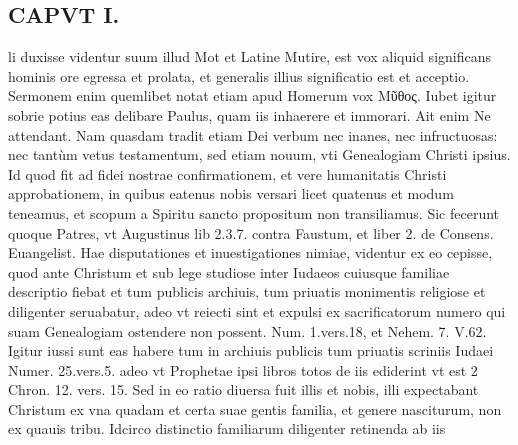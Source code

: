 \documentclass{article}
\begin{document}
\begin{pages}
\section*{CAPVT I. }
\marginpar{[ p.11 ]}\pstart li duxisse videntur suum illud Mot et Latine Mutire, est vox aliquid significans hominis ore egressa et prolata, et generalis illius significatio est et acceptio. Sermonem enim quemlibet notat etiam apud Homerum vox Μῦθος. Iubet igitur sobrie potius eas delibare Paulus, quam iis inhaerere et immorari. Ait enim Ne attendant. Nam quasdam tradit etiam Dei verbum nec inanes, nec infructuosas: nec tantùm vetus testamentum, sed etiam nouum, vti Genealogiam Christi ipsius. Id quod fit ad fidei nostrae confirmationem, et vere humanitatis Christi approbationem, in quibus eatenus nobis versari licet quatenus et modum teneamus, et scopum a Spiritu sancto propositum non transiliamus. Sic fecerunt quoque Patres, vt Augustinus lib 2.3.7. contra Faustum, et liber 2. de Consens. Euangelist.  \pend\pstart Hae disputationes et inuestigationes nimiae, videntur ex eo cepisse, quod ante Christum et sub lege studiose inter Iudaeos cuiusque familiae descriptio fiebat et tum publicis archiuis, tum priuatis monimentis religiose et diligenter seruabatur, adeo vt reiecti sint et expulsi ex sacrificatorum numero qui suam Genealogiam ostendere non possent. Num. 1.vers.18, et Nehem. 7. V.62. Igitur iussi sunt eas habere tum in archiuis publicis tum priuatis scriniis Iudaei Numer. 25.vers.5. adeo vt Prophetae ipsi libros totos de iis ediderint vt est 2 Chron. 12. vers. 15. Sed in eo ratio diuersa fuit illis et nobis, illi expectabant Christum ex vna quadam et certa suae gentis familia, et genere nasciturum, non ex quauis tribu. Idcirco distinctio familiarum diligenter retinenda ab iis  \pend

\end{pages}
\end{document}
